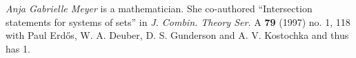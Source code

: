 \documentclass[12pt]{article}
\begin{document}
\emph{Anja Gabrielle Meyer} is a mathematician. She co-authored ``Intersection statements for systems of sets'' in {\it J. Combin. Theory Ser.} A {\bf 79} (1997) no. 1, 118 with Paul Erd\H{o}s, W. A. Deuber, D. S. Gunderson and A. V. Kostochka and thus has  1.
\end{document}
